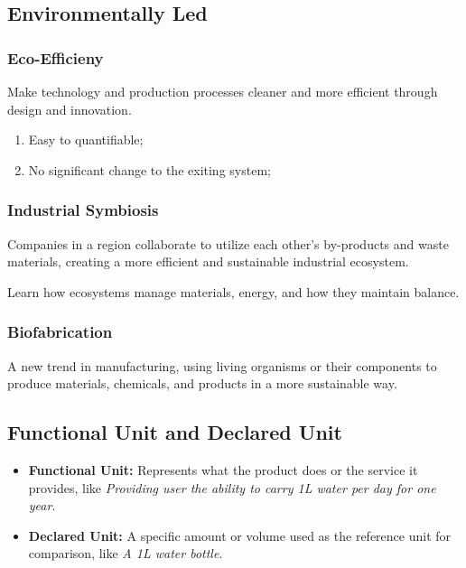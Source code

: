 \documentclass{NoteThesis/note-thesis}
\begin{document}
\subsection{Environmentally Led}

\subsubsection*{Eco-Efficieny}

Make technology and production processes cleaner and more efficient through design and innovation.

\begin{enumerate}
    \item Easy to quantifiable;
    \item No significant change to the exiting system;
\end{enumerate}

\subsubsection*{Industrial Symbiosis}

Companies in a region collaborate to utilize each other's by-products and waste materials, creating a more efficient and sustainable industrial ecosystem.

\begin{mynote_env}[frametitle={Biomimicry}]
    Learn how ecosystems manage materials, energy, and how they maintain balance.
\end{mynote_env}

\subsubsection*{Biofabrication}

A new trend in manufacturing, using living organisms or their components to produce materials, chemicals, and products in a more sustainable way.

\subsection{Functional Unit and Declared Unit}

\begin{itemize}
    \item \textbf{Functional Unit:} Represents what the product does or the service it provides, like \textit{Providing user the ability to carry 1L water per day for one year}.
    \item \textbf{Declared Unit:} A specific amount or volume used as the reference unit for comparison, like \textit{A 1L water bottle}.
\end{itemize}
\end{document}
